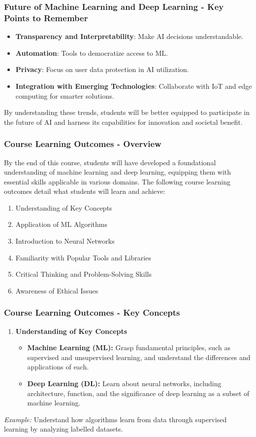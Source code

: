 \documentclass[aspectratio=169]{beamer}
\begin{document}
\begin{frame}[fragile]
    \frametitle{Future of Machine Learning and Deep Learning - Key Points to Remember}
    \begin{itemize}
        \item \textbf{Transparency and Interpretability}: Make AI decisions understandable.
        \item \textbf{Automation}: Tools to democratize access to ML.
        \item \textbf{Privacy}: Focus on user data protection in AI utilization.
        \item \textbf{Integration with Emerging Technologies}: Collaborate with IoT and edge computing for smarter solutions.
    \end{itemize}
    By understanding these trends, students will be better equipped to participate in the future of AI and harness its capabilities for innovation and societal benefit.
\end{frame}

\begin{frame}[fragile]
    \frametitle{Course Learning Outcomes - Overview}
    By the end of this course, students will have developed a foundational understanding of machine learning and deep learning, equipping them with essential skills applicable in various domains. The following course learning outcomes detail what students will learn and achieve:
    
    \begin{enumerate}
        \item Understanding of Key Concepts
        \item Application of ML Algorithms
        \item Introduction to Neural Networks
        \item Familiarity with Popular Tools and Libraries
        \item Critical Thinking and Problem-Solving Skills
        \item Awareness of Ethical Issues
    \end{enumerate}
\end{frame}

\begin{frame}[fragile]
    \frametitle{Course Learning Outcomes - Key Concepts}
    \begin{enumerate}
        \item \textbf{Understanding of Key Concepts}
        \begin{itemize}
            \item \textbf{Machine Learning (ML):}
            Grasp fundamental principles, such as supervised and unsupervised learning, and understand the differences and applications of each.
            \item \textbf{Deep Learning (DL):}
            Learn about neural networks, including architecture, function, and the significance of deep learning as a subset of machine learning.
        \end{itemize}
    \end{enumerate}
    \textit{Example:} Understand how algorithms learn from data through supervised learning by analyzing labelled datasets.
\end{frame}
\end{document}
